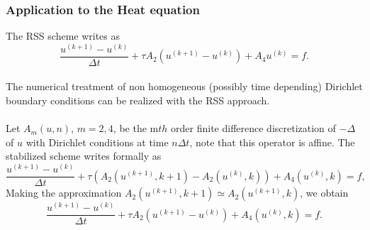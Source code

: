 \documentclass[hyperref={pdfpagemode=FullScreen},9pt]{beamer}
\newcommand{\Frac}[2] {\frac{\textstyle #1} {\textstyle #2}}
\begin{document}
 \begin{frame}
 \frametitle{Application to the Heat equation}
The RSS scheme writes as
\begin{equation}
\Frac{u^{(k+1)}-u^{(k)}}{\Delta t}+\tau A_2(u^{(k+1)}-u^{(k)})+A_4u^{(k)}=f.
\end{equation}
\\

The numerical treatment of non homogeneous (possibly time depending) Dirichlet boundary conditions can be realized with the RSS approach. \\
\\
Let $A_m(u,n)$, $m=2,4$, be  the m$th$ order finite difference discretization of $-\Delta$ of $u$  with Dirichlet conditions at time $n\Delta t$, note that this operator is affine. The stabilized scheme writes  formally as
\begin{equation}
\Frac{u^{(k+1)}-u^{(k)}}{\Delta t}+\tau
(A_2(u^{(k+1)},k+1)-A_2(u^{(k)},k))+A_4(u^{(k)},k)=f,
\end{equation}
Making the approximation $A_2(u^{(k+1)},k+1)\simeq A_2(u^{(k+1)},k)$, we obtain
\begin{equation}
\Frac{u^{(k+1)}-u^{(k)}}{\Delta t}+\tau
A_2(u^{(k+1)}-u^{(k)})+A_4(u^{(k)},k)=f.
\end{equation}

\end{frame}
\end{document}
